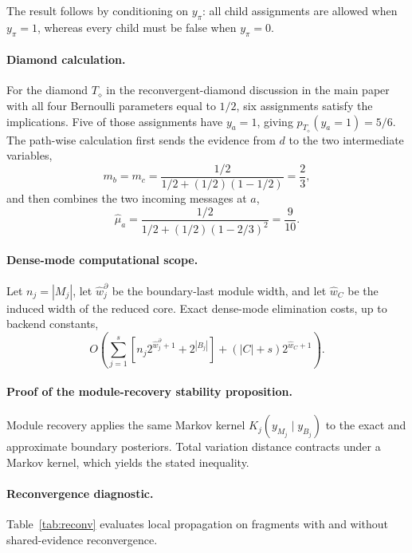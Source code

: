 \documentclass[letterpaper]{article}
\begin{document}
The result follows by conditioning on \(y_\pi\): all child assignments
are allowed when \(y_\pi=1\), whereas every child must be false when
\(y_\pi=0\).

\paragraph{Diamond calculation.}
\label{app:diamond-calculation}
For the diamond \(T_{\diamond}\) in the reconvergent-diamond discussion in the main paper
with all four Bernoulli parameters equal to \(1/2\), six assignments
satisfy the implications. Five of those assignments have \(y_a=1\), giving
\(p_{T_{\diamond}}(y_a=1)=5/6\). The path-wise calculation first sends
the evidence from \(d\) to the two intermediate variables,
\[
m_b=m_c
=
\frac{1/2}{1/2+(1/2)(1-1/2)}
=
\frac{2}{3},
\]
and then combines the two incoming messages at \(a\),
\[
\widehat{\mu}_a
=
\frac{1/2}{1/2+(1/2)(1-2/3)^2}
=
\frac{9}{10}.
\]

\paragraph{Dense-mode computational scope.}
\label{app:dense-cost}
Let \(n_j=|M_j|\), let \(\widehat w_j^\partial\) be the boundary-last
module width, and let \(\widehat w_C\) be the induced width of the reduced
core. Exact dense-mode elimination costs, up to backend constants,
\[
O\!\left(
\sum_{j=1}^{s}\!\left[n_j2^{\widehat w_j^\partial+1}+2^{|B_j|}\right]
+
(|C|+s)2^{\widehat w_C+1}
\right).
\]

\paragraph{Proof of the module-recovery stability proposition.}
\label{app:boundary-error-proof}
Module recovery applies the same Markov kernel
\(K_j(y_{M_j}\mid y_{B_j})\) to the exact and approximate boundary
posteriors. Total variation distance contracts under a Markov kernel,
which yields the stated inequality.

\paragraph{Reconvergence diagnostic.}
Table~\ref{tab:reconv} evaluates local propagation on fragments with and
without shared-evidence reconvergence.
\end{document}
